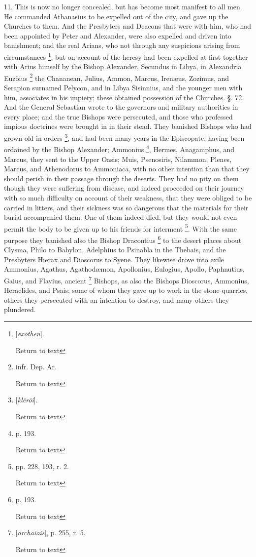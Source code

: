 11. This is now no longer concealed, but has
become most manifest to all men. He commanded Athanasius to be
expelled out of the city, and gave up the Churches to them. And the
Presbyters and Deacons that were with him, who had been appointed by
Peter and Alexander, were also expelled and driven into banishment;
and the real Arians, who not through any suspicions arising from
circumstances \footnote{[\emph{ex\={o}then}].

Return to text}, but on account of the heresy had been
expelled at first together with Arius himself by the Bishop Alexander,
Secundus in Libya, in Alexandria Euzöius \footnote{infr. Dep.
Ar.

Return to text} the Chananean,
Julius, Ammon, Marcus, Irenæus, Zozimus, and Serapion surnamed
Pelycon, and in Libya Sisinnius, and the younger men with him,
associates in his impiety; these obtained possession of the Churches.
§. 72. And the General Sebastian wrote to the governors and military
authorities in every place; and the true Bishops were persecuted, and
those who professed impious doctrines were brought in in their stead.
They banished Bishops who had grown old in orders \footnote{[\emph{kl\={e}r\={o}i}].

Return to text}, and had
been many years in the Episcopate, having been ordained by the Bishop
Alexander; Ammonius \footnote{p. 193.

Return to text}, Hermes, Anagamphus, and Marcus, they
sent to the Upper Oasis; Muis, Psenosiris, Nilammon, Plenes, Marcus,
and Athenodorus to Ammoniaca, with no other intention than that they
should perish in their passage through the deserts. They had no pity
on them though they were suffering from disease, and indeed proceeded
on their journey with so much difficulty on account of their weakness,
that they were obliged to be carried in litters, and their
sickness was so dangerous that the materials for their burial
accompanied them. One of them indeed died, but they would not even
permit the body to be given up to his friends for interment \footnote{pp. 228, 193, r. 2.

Return to text}.
With the same purpose they banished also the Bishop Dracontius \footnote{p. 193.

Return to text} to the desert places about Clysma, Philo to Babylon, Adelphius to
Psinabla in the Thebais, and the Presbyters Hierax and Dioscorus to
Syene. They likewise drove into exile Ammonius, Agathus, Agathodæmon,
Apollonius, Eulogius, Apollo, Paphnutius, Gaius, and Flavius, ancient
\footnote{[\emph{archaiois}], p. 255, r. 5.

Return to text} Bishops, as also the Bishops Dioscorus, Ammonius, Heraclides,
and Psais; some of whom they gave up to work in the stone-quarries,
others they persecuted with an intention to destroy, and many others
they plundered.

